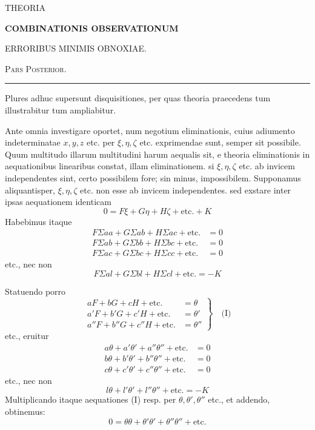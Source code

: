 \begin{center}
{\large THEORIA\par}
\medskip
{\Large\bfseries COMBINATIONIS OBSERVATIONUM\par}
\medskip
{\large ERRORIBUS MINIMIS OBNOXIAE.\par}
\medskip
{\large\textsc{Pars Posterior.}\par}
\medskip
\rule{.22\linewidth}{.3pt}
\end{center}
Plures adhuc supersunt disquisitiones, per quas theoria praecedens tum illustrabitur tum ampliabitur.

Ante omnia investigare oportet, num negotium eliminationis, cuius adiumento indeterminatae \(x,y,z\) etc. per \(\xi,\eta,\zeta\) etc. exprimendae sunt, semper sit possibile. Quum multitudo illarum multitudini harum aequalis sit, e theoria eliminationis in aequationibus linearibus constat, illam eliminationem. si \(\xi,\eta,\zeta\) etc. ab invicem independentes sint, certo possibilem fore; sin minus, impossibilem. Supponamus aliquantisper, \(\xi,\eta,\zeta\) etc. non esse ab invicem independentes. sed exstare inter ipsas aequationem identicam
\[
0=F\xi+G\eta+H\zeta+\text{etc.}+K
\]
Habebimus itaque
\[
\begin{aligned}
F\Sigma aa+G\Sigma ab+H\Sigma ac+\text{etc.}&=0\\
F\Sigma ab+G\Sigma bb+H\Sigma bc+\text{etc.}&=0\\
F\Sigma ac+G\Sigma bc+H\Sigma cc+\text{etc.}&=0
\end{aligned}
\]
etc., nec non
\[
F\Sigma al+G\Sigma bl+H\Sigma cl+\text{etc.}=-K
\]
\par{}
Statuendo porro
\[
\left.\begin{aligned}
aF+bG+cH+\text{etc.}&=\theta\\
a'F+b'G+c'H+\text{etc.}&=\theta'\\
a''F+b''G+c''H+\text{etc.}&=\theta''
\end{aligned}\right\}\quad\text{(I)}
\]
etc., eruitur
\[
\begin{aligned}
a\theta+a'\theta'+a''\theta''+\text{etc.}&=0\\
b\theta+b'\theta'+b''\theta''+\text{etc.}&=0\\
c\theta+c'\theta'+c''\theta''+\text{etc.}&=0
\end{aligned}
\]
etc., nec non
\[
l\theta+l'\theta'+l''\theta''+\text{etc.}=-K
\]
Multiplicando itaque aequationes (I) resp. per \(\theta,\theta',\theta''\) etc., et addendo, obtinemus:
\[
0=\theta\theta+\theta'\theta'+\theta''\theta''+\text{etc.}
\]
